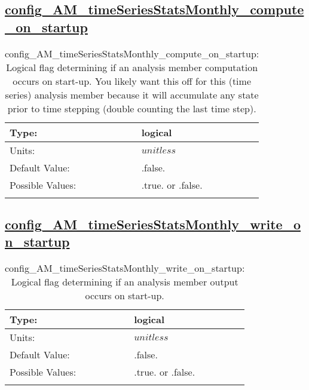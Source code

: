 \subsection[config\_AM\_timeSeriesStatsMonthly\_compute\_on\_startup]{\hyperref[sec:nm_tab_AM_timeSeriesStatsMonthly]{config\_AM\_timeSeriesStatsMonthly\_compute\_on\_startup}}
\label{subsec:nm_sec_config_AM_timeSeriesStatsMonthly_compute_on_startup}
\begin{center}
\begin{longtable}{| p{2.0in} || p{4.0in} |}
    \hline
    Type: & logical \\
    \hline
    Units: & $unitless$ \\
    \hline
    Default Value: & .false. \\
    \hline
    Possible Values: & .true. or .false. \\
    \hline
    \caption{config\_AM\_timeSeriesStatsMonthly\_compute\_on\_startup: Logical flag determining if an analysis member computation occurs on start-up. You likely want this off for this (time series) analysis member because it will accumulate any state prior to time stepping (double counting the last time step).}
\end{longtable}
\end{center}
\subsection[config\_AM\_timeSeriesStatsMonthly\_write\_on\_startup]{\hyperref[sec:nm_tab_AM_timeSeriesStatsMonthly]{config\_AM\_timeSeriesStatsMonthly\_write\_on\_startup}}
\label{subsec:nm_sec_config_AM_timeSeriesStatsMonthly_write_on_startup}
\begin{center}
\begin{longtable}{| p{2.0in} || p{4.0in} |}
    \hline
    Type: & logical \\
    \hline
    Units: & $unitless$ \\
    \hline
    Default Value: & .false. \\
    \hline
    Possible Values: & .true. or .false. \\
    \hline
    \caption{config\_AM\_timeSeriesStatsMonthly\_write\_on\_startup: Logical flag determining if an analysis member output occurs on start-up.}
\end{longtable}
\end{center}
